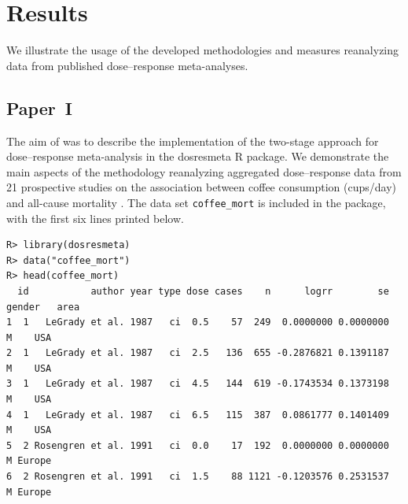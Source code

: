 \documentclass[11pt,a4paper,twoside,openany]{book}\usepackage{knitr}
\newcommand{\pkg}[1]{{\fontseries{b}\selectfont #1}}
\begin{document}
{%

%

\chapter{Results}

We illustrate the usage of the developed methodologies and measures reanalyzing data from published dose--response meta-analyses. 

\section{Paper~I}\label{sec:res_paperI}

The aim of  was to describe the implementation of the two-stage approach for dose--response meta-analysis in the \pkg{dosresmeta} \textsf{R} package.
We demonstrate the main aspects of the methodology reanalyzing aggregated dose--response data from 21 prospective studies on the association between coffee consumption (cups/day) and all-cause mortality \citep{crippa2014coffee}. The data set \texttt{coffee\_mort} is included in the package, with the first six lines printed below.

\begin{knitrout}\footnotesize
{}\color{fgcolor}\begin{kframe}
\begin{verbatim}
R> library(dosresmeta)
R> data("coffee_mort")
R> head(coffee_mort)
  id           author year type dose cases    n      logrr        se gender   area
1  1   LeGrady et al. 1987   ci  0.5    57  249  0.0000000 0.0000000      M    USA
2  1   LeGrady et al. 1987   ci  2.5   136  655 -0.2876821 0.1391187      M    USA
3  1   LeGrady et al. 1987   ci  4.5   144  619 -0.1743534 0.1373198      M    USA
4  1   LeGrady et al. 1987   ci  6.5   115  387  0.0861777 0.1401409      M    USA
5  2 Rosengren et al. 1991   ci  0.0    17  192  0.0000000 0.0000000      M Europe
6  2 Rosengren et al. 1991   ci  1.5    88 1121 -0.1203576 0.2531537      M Europe
\end{verbatim}
\end{kframe}
\end{knitrout}

}
\end{document}
